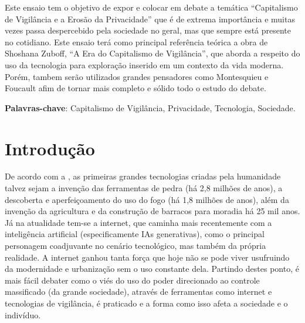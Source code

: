 \documentclass[
	12pt,
	openright,
	twoside,
	a4paper,
	english,
	french,
	spanish,
	brazil
]{abntex2}
\begin{document}
  \frenchspacing
  \imprimircapa
  \imprimirfolhaderosto*

  \setlength{\absparsep}{18pt}
  \begin{resumo}
    Este ensaio tem o objetivo de expor e colocar em debate a temática
    ``Capitalismo de Vigilância e a Erosão da Privacidade''  que é de extrema
    importância e muitas vezes passa despercebido pela sociedade no geral, mas
    que sempre está presente no cotidiano. Este ensaio terá como principal
    referência teórica a obra de Shoshana Zuboff, ``A Era do Capitalismo de
    Vigilância'', que aborda a respeito do uso da tecnologia para exploração
    inserido em um contexto da vida moderna. Porém, tambem serão utilizados
    grandes pensadores como Montesquieu e Foucault afim de tornar mais completo
    e sólido todo o estudo do debate.

    \textbf{Palavras-chave}:
      Capitalismo de Vigilância, Privacidade, Tecnologia, Sociedade.
  \end{resumo}


  \textual

  \chapter{Introdução}

  De acordo com a , as primeiras grandes tecnologias
  criadas pela humanidade talvez sejam a invenção das ferramentas de pedra (há
  2,8 milhões de anos), a descoberta e aperfeiçoamento do uso do fogo (há 1,8
  milhões de anos), além da invenção da agricultura e da construção de barracos
  para moradia há 25 mil anos. Já na atualidade tem-se a internet, que caminha
  mais recentemente com a inteligência artificial (especificamente IAs
  generativas), como o principal personagem coadjuvante no cenário tecnológico,
  mas também da própria realidade. A internet ganhou tanta força que hoje não se
  pode viver usufruindo da modernidade e urbanização sem o uso constante dela.
  Partindo destes ponto, é mais fácil debater como o viés do uso do poder
  direcionado ao controle massificado (da grande sociedade), através de
  ferramentas como internet e tecnologias de vigilância, é praticado e a forma
  como isso afeta a sociedade e o indivíduo.
\end{document}
